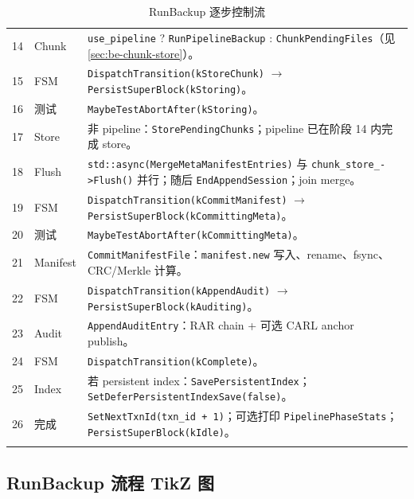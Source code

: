 \begin{longtable}{@{}cp{2.8cm}p{9.2cm}@{}}
14 & Chunk &
  \texttt{use\_pipeline} ? \texttt{RunPipelineBackup} : \texttt{ChunkPendingFiles}（见 \cref{sec:be-chunk-store}）。 \\
15 & FSM & \texttt{DispatchTransition(kStoreChunk)} $\rightarrow$ \texttt{PersistSuperBlock(kStoring)}。 \\
16 & 测试 & \texttt{MaybeTestAbortAfter(kStoring)}。 \\
17 & Store & 非 pipeline：\texttt{StorePendingChunks}；pipeline 已在阶段 14 内完成 store。 \\
18 & Flush &
  \texttt{std::async(MergeMetaManifestEntries)} 与 \texttt{chunk\_store\_->Flush()} 并行；随后 \texttt{EndAppendSession}；join merge。 \\
19 & FSM & \texttt{DispatchTransition(kCommitManifest)} $\rightarrow$ \texttt{PersistSuperBlock(kCommittingMeta)}。 \\
20 & 测试 & \texttt{MaybeTestAbortAfter(kCommittingMeta)}。 \\
21 & Manifest & \texttt{CommitManifestFile}：\texttt{manifest.new} 写入、rename、fsync、CRC/Merkle 计算。 \\
22 & FSM & \texttt{DispatchTransition(kAppendAudit)} $\rightarrow$ \texttt{PersistSuperBlock(kAuditing)}。 \\
23 & Audit & \texttt{AppendAuditEntry}：RAR chain + 可选 CARL anchor publish。 \\
24 & FSM & \texttt{DispatchTransition(kComplete)}。 \\
25 & Index & 若 persistent index：\texttt{SavePersistentIndex}；\texttt{SetDeferPersistentIndexSave(false)}。 \\
26 & 完成 & \texttt{SetNextTxnId(txn\_id + 1)}；可选打印 \texttt{PipelinePhaseStats}；\texttt{PersistSuperBlock(kIdle)}。 \\
\bottomrule
\caption{RunBackup 逐步控制流}
\label{tab:runbackup-steps}
\end{longtable}

\subsection{RunBackup 流程 TikZ 图}

